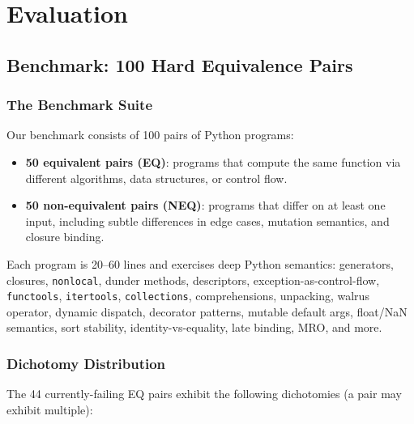 \documentclass[11pt,a4paper]{report}
\theoremstyle{definition}
\theoremstyle{plain}
\begin{document}
\part{Evaluation}

\chapter{Benchmark: 100 Hard Equivalence Pairs}
\label{ch:benchmark}

\section{The Benchmark Suite}

Our benchmark consists of 100 pairs of Python programs:
\begin{itemize}
  \item \textbf{50 equivalent pairs (EQ)}: programs that compute the
    same function via different algorithms, data structures, or
    control flow.
  \item \textbf{50 non-equivalent pairs (NEQ)}: programs that differ
    on at least one input, including subtle differences in edge cases,
    mutation semantics, and closure binding.
\end{itemize}

Each program is 20--60 lines and exercises deep Python semantics:
generators, closures, \texttt{nonlocal}, dunder methods, descriptors,
exception-as-control-flow, \texttt{functools}, \texttt{itertools},
\texttt{collections}, comprehensions, unpacking, walrus operator,
dynamic dispatch, decorator patterns, mutable default args,
float/NaN semantics, sort stability, identity-vs-equality, late
binding, MRO, and more.

\section{Dichotomy Distribution}

The 44 currently-failing EQ pairs exhibit the following dichotomies
(a pair may exhibit multiple):
\end{document}

